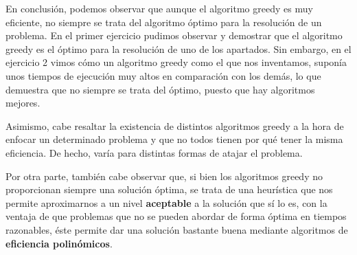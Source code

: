 En conclusión, podemos observar que aunque el algoritmo greedy es muy eficiente, 
no siempre se trata del algoritmo óptimo para la resolución de un problema. 
En el primer ejercicio pudimos observar y demostrar que el algoritmo greedy es 
el óptimo para la resolución de uno de los apartados. Sin embargo, en el ejercicio 2
vimos cómo un algoritmo greedy como el que nos inventamos, 
suponía unos tiempos de ejecución muy altos en comparación con los demás, lo que demuestra que no siempre
se trata del óptimo, puesto que hay algoritmos mejores.

Asimismo, cabe resaltar la existencia de distintos algoritmos greedy a la hora de 
enfocar un determinado problema y que no todos tienen por qué tener la misma eficiencia. 
De hecho, varía para distintas formas de atajar el problema. 

Por otra parte, también cabe observar que, si bien los algoritmos greedy no
proporcionan siempre una solución óptima, se trata de una heurística que nos
permite aproximarnos a un nivel \textbf{aceptable} a la solución que sí lo es, con la 
ventaja de que problemas que no se pueden abordar de forma óptima en tiempos
razonables, éste permite dar una solución bastante buena mediante algoritmos 
de \textbf{eficiencia polinómicos}. 